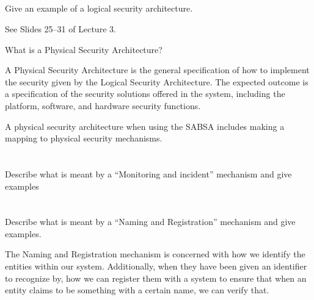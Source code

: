 \begin{questions}
\begin{parts}
  \part{} Give an example of a logical security architecture.
    \begin{solution}
      See Slides 25--31 of Lecture 3.
    \end{solution}
  \end{parts}

\question{} What is a Physical Security Architecture?
  \begin{solution}
    A Physical Security Architecture is the general specification of how to implement the security given by the Logical Security Architecture.
    The expected outcome is a specification of the security solutions offered in the system, including the platform, software, and hardware security functions.
  \end{solution}

\question{} A physical security architecture when using the SABSA includes making a mapping to physical security mechanisms.
  \begin{parts}
  \part{} Describe what is meant by a ``Monitoring and incident'' mechanism and give examples
  \part{} Describe what is meant by a ``Naming and Registration'' mechanism and give examples.
    \begin{solution}
      The Naming and Registration mechanism is concerned with how we identify the entities within our system.
      Additionally, when they have been given an identifier to recognize by, how we can register them with a system to ensure that when an entity claims to be something with a certain name, we can verify that.


\end{solution}
\end{parts}
\end{questions}
